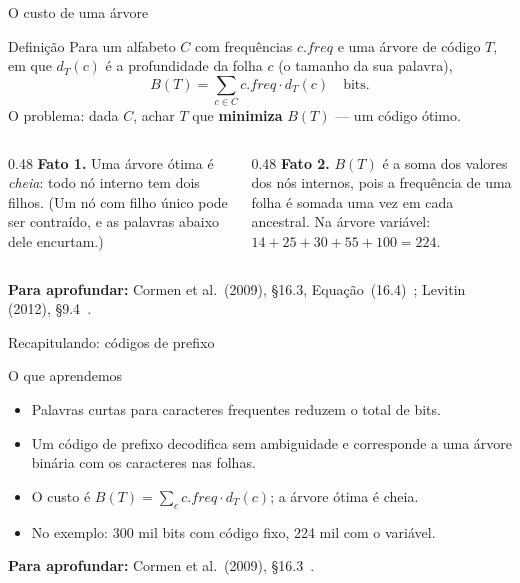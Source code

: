 \documentclass[aspectratio=169,xcolor=table]{beamer}
\newcommand{\fonte}[1]{%
  \vfill
  {\tiny\color{gray!55!black}\textbf{Para aprofundar:} #1\par}%
}
\begin{document}
\begin{frame}{O custo de uma árvore}
  \begin{block}{Definição}
    \small Para um alfabeto $C$ com frequências $c.\mathit{freq}$ e uma árvore de código $T$,
    em que $d_T(c)$ é a profundidade da folha $c$ (o tamanho da sua palavra),
    \[ B(T) = \sum_{c \in C} c.\mathit{freq} \cdot d_T(c) \quad\text{bits.} \]
    O problema: dada $C$, achar $T$ que \textbf{minimiza} $B(T)$ --- um código ótimo.
  \end{block}
  \begin{columns}[T]
    \begin{column}{0.48\textwidth}
      \scriptsize
      \textbf{Fato 1.} Uma árvore ótima é \emph{cheia}: todo nó interno tem dois filhos.
      (Um nó com filho único pode ser contraído, e as palavras abaixo dele encurtam.)
    \end{column}
    \begin{column}{0.48\textwidth}
      \scriptsize
      \textbf{Fato 2.} $B(T)$ é a soma dos valores dos nós internos, pois a frequência de
      uma folha é somada uma vez em cada ancestral. Na árvore variável:
      $14 + 25 + 30 + 55 + 100 = 224$.
    \end{column}
  \end{columns}
  \fonte{Cormen et al.\ (2009), \S 16.3, Equação~(16.4)~\cite{cormen2009introduction};
    Levitin (2012), \S 9.4~\cite{levitin2012introduction}.}
\end{frame}

\begin{frame}{Recapitulando: códigos de prefixo}
  \begin{block}{O que aprendemos}
    \begin{itemize}
      \item Palavras curtas para caracteres frequentes reduzem o total de bits.
      \item Um código de prefixo decodifica sem ambiguidade e corresponde a uma árvore
            binária com os caracteres nas folhas.
      \item O custo é $B(T) = \sum_c c.\mathit{freq} \cdot d_T(c)$; a árvore ótima é cheia.
      \item No exemplo: 300 mil bits com código fixo, 224 mil com o variável.
    \end{itemize}
  \end{block}
  \fonte{Cormen et al.\ (2009), \S 16.3~\cite{cormen2009introduction}.}
\end{frame}
\end{document}
